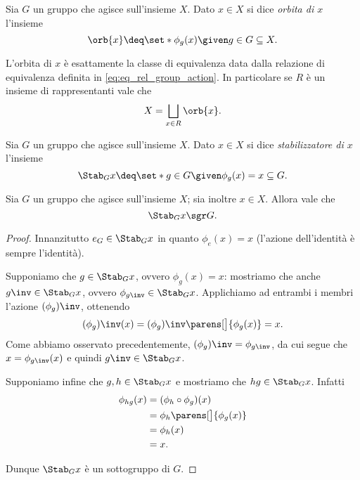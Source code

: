 \begin{definition}[Orbita]
    Sia $G$ un gruppo che agisce sull'insieme $X$. Dato $x \in X$ si dice \emph{orbita di $x$} l'insieme \[
        \orb{x} \deq \set*{\phi_g(x) \given g \in G} \subseteq X.    
    \]
\end{definition}

\begin{remark}
    L'orbita di $x$ è esattamente la classe di equivalenza data dalla relazione di equivalenza definita in \eqref{eq:eq_rel_group_action}. In particolare se $R$ è un insieme di rappresentanti vale che \[
        X = \bigsqcup_{x \in R} \orb{x}.    
    \]
\end{remark}

\begin{definition}[Stabilizzatore]
    Sia $G$ un gruppo che agisce sull'insieme $X$. Dato $x \in X$ si dice \emph{stabilizzatore di $x$} l'insieme \[
        \Stab_{G}{x} \deq \set*{g \in G \given \phi_g(x) = x} \subseteq G.    
    \]
\end{definition}

\begin{proposition}
    Sia $G$ un gruppo che agisce sull'insieme $X$; sia inoltre $x \in X$. Allora vale che \[
        \Stab_{G}{x} \sgr G.    
    \]
\end{proposition}
\begin{proof}
    Innanzitutto $e_G \in \Stab_{G}{x}$ in quanto $\phi_e(x) = x$ (l'azione dell'identità è sempre l'identità).

    Supponiamo che $g \in \Stab_{G}{x}$, ovvero $\phi_g(x) = x$: mostriamo che anche $g\inv \in \Stab_{G}{x}$, ovvero $\phi_{g\inv} \in \Stab_{G}{x}$. Applichiamo ad entrambi i membri l'azione $(\phi_g)\inv$, ottenendo \begin{align*}
        (\phi_g)\inv(x) = (\phi_g)\inv\parens[\big]{\phi_g(x)} = x.
    \end{align*} Come abbiamo osservato precedentemente, $(\phi_g)\inv = \phi_{g\inv}$, da cui segue che $x = \phi_{g\inv}(x)$ e quindi $g\inv \in \Stab_{G}{x}$.

    Supponiamo infine che $g, h \in \Stab_{G}{x}$ e mostriamo che $hg \in \Stab_{G}{x}$. Infatti \begin{align*}
        \phi_{hg}(x) &= (\phi_h \circ \phi_g)(x)\\
        &= \phi_h\parens[\big]{\phi_g(x)}\\
        &= \phi_h(x)\\
        &= x.
    \end{align*}

    Dunque $\Stab_{G}{x}$ è un sottogruppo di $G$.
\end{proof}


